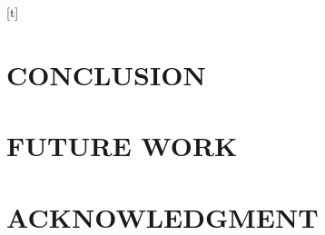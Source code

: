\documentclass[letterpaper, 10 pt, conference]{ieeeconf}  %
\begin{document}
\begin{table*}[t]
\end{table*}[t]


\section{CONCLUSION}

\section{FUTURE WORK}


\addtolength{\textheight}{-12cm}   %








\section*{ACKNOWLEDGMENT}





\end{document}
